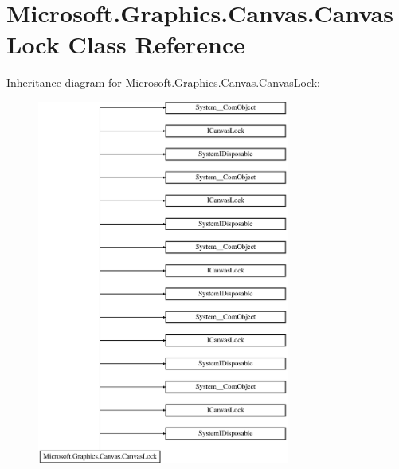 \hypertarget{class_microsoft_1_1_graphics_1_1_canvas_1_1_canvas_lock}{}\section{Microsoft.\+Graphics.\+Canvas.\+Canvas\+Lock Class Reference}
\label{class_microsoft_1_1_graphics_1_1_canvas_1_1_canvas_lock}
Inheritance diagram for Microsoft.\+Graphics.\+Canvas.\+Canvas\+Lock\+:\begin{figure}[H]
\begin{center}
\leavevmode
\includegraphics[height=12.000000cm]{class_microsoft_1_1_graphics_1_1_canvas_1_1_canvas_lock}
\end{center}
\end{figure}
